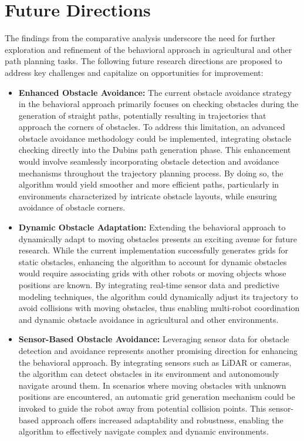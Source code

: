 
\chapter{Future Directions}


The findings from the comparative analysis underscore the need for further exploration and refinement of the behavioral approach in agricultural and other path planning tasks. The following future research directions are proposed to address key challenges and capitalize on opportunities for improvement:

\begin{itemize}
    \item \textbf{Enhanced Obstacle Avoidance:} The current obstacle avoidance strategy in the behavioral approach primarily focuses on checking obstacles during the generation of straight paths, potentially resulting in trajectories that approach the corners of obstacles. To address this limitation, an advanced obstacle avoidance methodology could be implemented, integrating obstacle checking directly into the Dubins path generation phase. This enhancement would involve seamlessly incorporating obstacle detection and avoidance mechanisms throughout the trajectory planning process. By doing so, the algorithm would yield smoother and more efficient paths, particularly in environments characterized by intricate obstacle layouts, while ensuring avoidance of obstacle corners.
    
    \item \textbf{Dynamic Obstacle Adaptation:} Extending the behavioral approach to dynamically adapt to moving obstacles presents an exciting avenue for future research. While the current implementation successfully generates grids for static obstacles, enhancing the algorithm to account for dynamic obstacles would require associating grids with other robots or moving objects whose positions are known. By integrating real-time sensor data and predictive modeling techniques, the algorithm could dynamically adjust its trajectory to avoid collisions with moving obstacles, thus enabling multi-robot coordination and dynamic obstacle avoidance in agricultural and other environments.
    
    \item \textbf{Sensor-Based Obstacle Avoidance:} Leveraging sensor data for obstacle detection and avoidance represents another promising direction for enhancing the behavioral approach. By integrating sensors such as LiDAR or cameras, the algorithm can detect obstacles in its environment and autonomously navigate around them. In scenarios where moving obstacles with unknown positions are encountered, an automatic grid generation mechanism could be invoked to guide the robot away from potential collision points. This sensor-based approach offers increased adaptability and robustness, enabling the algorithm to effectively navigate complex and dynamic environments.
    

\end{itemize}
